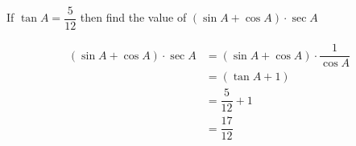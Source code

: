 
%
%
%
%
% 

\question[1]  If $\tan A = \dfrac{5}{12}$ then find the value of
$(\sin A + \cos A)\cdot\sec A$

\ifprintanswers
\fi 

\begin{solution}[\mcq]
	\begin{align}
		(\sin A + \cos A)\cdot\sec A &= (\sin A + \cos A)\cdot\dfrac{1}{\cos A} \\
		                             &= (\tan A + 1) \\
		                             &= \dfrac{5}{12} + 1 \\
		                             &= \dfrac{17}{12}
	\end{align}
\end{solution}
